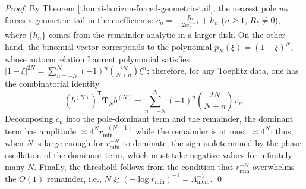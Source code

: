 \begin{proof}
By Theorem \ref{thm:xi-horizon-forced-geometric-tail}, the nearest pole \(w_\ast\) forces a geometric tail in the coefficients:
\(
c_n=-\frac{R_\ast}{2w_\ast^{n+1}}+h_n
\)
(\(n\ge 1\), \(R_\ast\neq 0\)), where \(\{h_n\}\) comes from the remainder analytic in a larger disk.
On the other hand, the binomial vector corresponds to the polynomial \(p_N(\xi)=(1-\xi)^N\), whose autocorrelation Laurent polynomial satisfies
\(
|1-\xi|^{2N}=\sum_{n=-N}^{N}(-1)^n\binom{2N}{N+n}\xi^n
\);
therefore, for any Toeplitz data, one has the combinatorial identity
\[
(b^{(N)})^{\mathsf T}\mathbf{T}_N b^{(N)}
=\sum_{n=-N}^{N}(-1)^n\binom{2N}{N+n}\,c_n.
\]
Decomposing \(c_n\) into the pole-dominant term and the remainder, the dominant term has amplitude \(\asymp 4^N r_{\min}^{-(N+1)}\) while the remainder is at most \(\asymp 4^N\);
thus, when \(N\) is large enough for \(r_{\min}^{-N}\) to dominate, the sign is determined by the phase oscillation of the dominant term, which must take negative values for infinitely many \(N\).
Finally, the threshold follows from the condition that \(r_{\min}^{-N}\) overwhelms the \(O(1)\) remainder, i.e., \(N\gtrsim (-\log r_{\min})^{-1}=\Lambda_{\mathrm{mom}}^{-1}\). \qed
\end{proof}

\endinput
